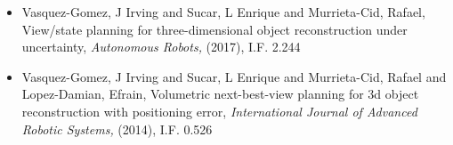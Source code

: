 \begin{itemize}
\item Vasquez-Gomez, J Irving and Sucar, L Enrique and Murrieta-Cid, Rafael, View/state planning for three-dimensional object reconstruction under uncertainty,\textit{ Autonomous Robots,} (2017), I.F. 2.244 
\item Vasquez-Gomez, J Irving and Sucar, L Enrique and Murrieta-Cid, Rafael and Lopez-Damian, Efrain, Volumetric next-best-view planning for 3d object reconstruction with positioning error,\textit{ International Journal of Advanced Robotic Systems,} (2014), I.F. 0.526 
\end{itemize} 
